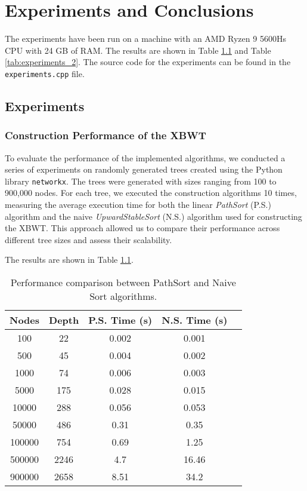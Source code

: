 \chapter{Experiments and Conclusions}

The experiments have been run on a machine with an AMD Ryzen 9 5600Hs CPU with 24 GB of RAM. The results are shown in Table \ref{tab:experiments} and Table \ref{tab:experiments_2}. The source code for the experiments can be found in the \texttt{experiments.cpp} file.

\section{Experiments}
\subsection{Construction Performance of the XBWT}
To evaluate the performance of the implemented algorithms, we conducted a series of experiments on randomly generated trees created using the Python library \texttt{networkx}. The trees were generated with sizes ranging from 100 to 900,000 nodes. For each tree, we executed the construction algorithms 10 times, measuring the average execution time for both the linear \emph{PathSort} (P.S.) algorithm and the naive \emph{UpwardStableSort} (N.S.) algorithm used for constructing the XBWT. This approach allowed us to compare their performance across different tree sizes and assess their scalability.


The results are shown in Table \ref{tab:experiments}.

\begin{table}[h]
    \centering
    \begin{tabular}{|c|c|c|c|c|}
        \hline
        \textbf{Nodes} & \textbf{Depth} & \textbf{P.S. Time (s)} & \textbf{N.S. Time (s)} \\
        \hline
        100 & 22 & 0.002 & 0.001 \\
        500 & 45 & 0.004 & 0.002  \\
        1000 & 74 & 0.006 & 0.003  \\
        5000 & 175 & 0.028 & 0.015 \\
        10000 & 288 & 0.056 & 0.053 \\
        50000 & 486 & 0.31 & 0.35 \\
        100000 & 754 & 0.69 & 1.25\\
        500000 & 2246 & 4.7 & 16.46 \\
        900000 & 2658 & 8.51 & 34.2 \\
        \hline
    \end{tabular}
    \caption{Performance comparison between PathSort and Naive Sort algorithms.}
    \label{tab:experiments}
\end{table}

